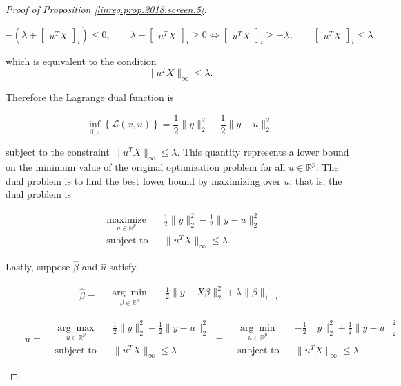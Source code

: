 \begin{proof}[Proof of Proposition \ref{linreg.prop.2018.screen.5}]
\begin{enumerate}[(a)]
\[
  -\left(\lambda+  \begin{bmatrix} u^T X \end{bmatrix}_i  \right) \leq 0, \qquad \lambda-  \begin{bmatrix} u^T X \end{bmatrix}_i   \geq 0 \iff \begin{bmatrix} u^TX\end{bmatrix}_i \geq -\lambda, \qquad \begin{bmatrix} u^TX\end{bmatrix}_i \leq \lambda
\]

which is equivalent to the condition
\[
\lVert u^TX \rVert_\infty \leq \lambda.
\]

Therefore the Lagrange dual function is


\begin{equation}\label{2018.screen.5.a.dual}
 \inf_{\beta, z} \left\{ \mathcal{L}(x, u)\right\}  = \frac{1}{2} \lVert y \rVert_2^2 - \frac{1}{2} \lVert y - u \rVert_2^2 
\end{equation}

subject to the constraint \(\lVert u^TX \rVert_\infty \leq \lambda\). This quantity represents a lower bound on the minimum value of the original optimization problem for all \(u \in \mathbb{R}^p\). The dual problem is to find the best lower bound by maximizing over \(u\); that is, the dual problem is

\begin{equation}\label{2018.screen.5.a.dual.ans}
\begin{aligned}
& \underset{u \in \mathbb{R}^p}{\text{maximize}}
& & \frac{1}{2} \lVert y \rVert_2^2 - \frac{1}{2} \lVert y - u \rVert_2^2  \\
& \text{subject to}
& & \lVert u^TX \rVert_\infty \leq \lambda.
\end{aligned}
\end{equation}

Lastly, suppose \(\hat{\beta}\) and \(\hat{u}\) satisfy

\[
\hat{\beta} = 
\begin{aligned}
& \underset{\beta \in \mathbb{R}^p}{\arg \min}
& & \frac{1}{2} \lVert y - X \beta \rVert_2^2 + \lambda \lVert \beta \rVert_1
\end{aligned},
\]

\[
 \qquad \hat{u} = 
\begin{aligned}
& \underset{u \in \mathbb{R}^p}{\arg \max}
& & \frac{1}{2} \lVert y \rVert_2^2 - \frac{1}{2} \lVert y - u \rVert_2^2  \\
& \text{subject to}
& & \lVert u^TX \rVert_\infty \leq \lambda
\end{aligned} = 
\begin{aligned}
& \underset{u \in \mathbb{R}^p}{\arg \min}
& & -\frac{1}{2} \lVert y \rVert_2^2 + \frac{1}{2} \lVert y - u \rVert_2^2  \\
& \text{subject to}
& & \lVert u^TX \rVert_\infty \leq \lambda
\end{aligned}
\]


\end{enumerate}
\end{proof}
